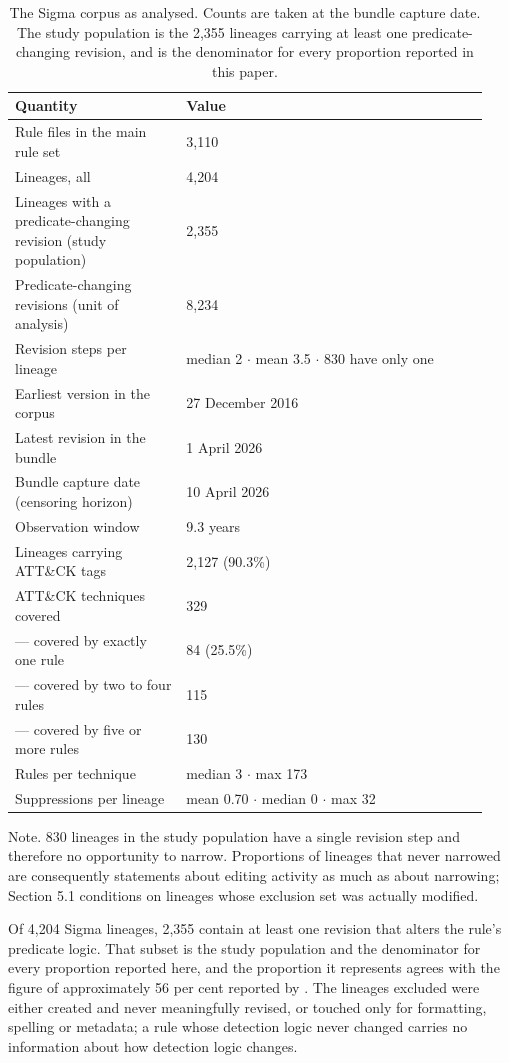 \begin{table}[htbp]
\centering
\small
\caption{The Sigma corpus as analysed. Counts are taken at the bundle capture date. The study population is the 2,355 lineages carrying at least one predicate-changing revision, and is the denominator for every proportion reported in this paper.}
\label{table:1}
\begin{tabular}{@{}p{0.34\linewidth}p{0.60\linewidth}@{}}
\toprule
Quantity & Value \\
\midrule
Rule files in the main rule set & 3,110 \\
Lineages, all & 4,204 \\
Lineages with a predicate-changing revision (study population) & 2,355 \\
Predicate-changing revisions (unit of analysis) & 8,234 \\
Revision steps per lineage & median 2 $\cdot$ mean 3.5 $\cdot$ 830 have only one \\
Earliest version in the corpus & 27 December 2016 \\
Latest revision in the bundle & 1 April 2026 \\
Bundle capture date (censoring horizon) & 10 April 2026 \\
Observation window & 9.3 years \\
Lineages carrying ATT\&CK tags & 2,127 (90.3\%) \\
ATT\&CK techniques covered & 329 \\
--- covered by exactly one rule & 84 (25.5\%) \\
--- covered by two to four rules & 115 \\
--- covered by five or more rules & 130 \\
Rules per technique & median 3 $\cdot$ max 173 \\
Suppressions per lineage & mean 0.70 $\cdot$ median 0 $\cdot$ max 32 \\
\bottomrule
\end{tabular}
\end{table}

Note. 830 lineages in the study population have a single revision step and therefore no opportunity to narrow. Proportions of lineages that never narrowed are consequently statements about editing activity as much as about narrowing; Section 5.1 conditions on lineages whose exclusion set was actually modified.

Of 4,204 Sigma lineages, 2,355 contain at least one revision that alters the rule's predicate logic. That subset is the study population and the denominator for every proportion reported here, and the proportion it represents agrees with the figure of approximately 56 per cent reported by \citet{long2026}. The lineages excluded were either created and never meaningfully revised, or touched only for formatting, spelling or metadata; a rule whose detection logic never changed carries no information about how detection logic changes.

